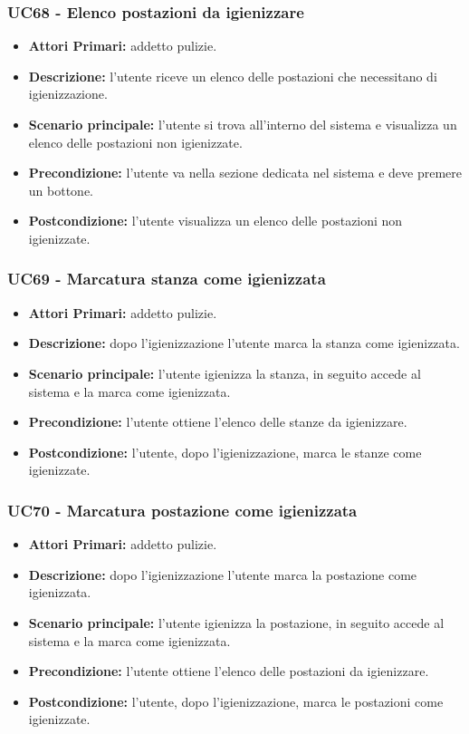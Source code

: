 \subsubsection{UC68 - Elenco postazioni da igienizzare}
\begin{itemize}
           	\item\textbf{Attori Primari:} addetto pulizie.
           	\item\textbf{Descrizione:} l'utente riceve un elenco delle postazioni che necessitano di igienizzazione.
           	\item\textbf{Scenario principale:} l'utente si trova all'interno del sistema e visualizza  un elenco delle postazioni non igienizzate.
           	\item\textbf{Precondizione:} l'utente va nella sezione dedicata nel sistema e deve premere un bottone.
           	\item\textbf{Postcondizione:} l'utente visualizza un elenco delle postazioni non igienizzate.
\end{itemize}

\subsubsection{UC69 - Marcatura stanza come igienizzata}
\begin{itemize}
           	\item\textbf{Attori Primari:} addetto pulizie.
           	\item\textbf{Descrizione:} dopo l'igienizzazione l'utente marca la stanza come igienizzata.
           	\item\textbf{Scenario principale:} l'utente igienizza la stanza, in seguito accede al sistema e la marca come igienizzata.
           	\item\textbf{Precondizione:} l'utente ottiene l'elenco delle stanze da igienizzare.
           	\item\textbf{Postcondizione:} l'utente, dopo l'igienizzazione, marca le stanze come igienizzate.
\end{itemize}

\subsubsection{UC70 - Marcatura postazione come igienizzata}
\begin{itemize}
           	\item\textbf{Attori Primari:} addetto pulizie.
           	\item\textbf{Descrizione:} dopo l'igienizzazione l'utente marca la postazione come igienizzata.
           	\item\textbf{Scenario principale:} l'utente igienizza la postazione, in seguito accede al sistema e la marca come igienizzata.
           	\item\textbf{Precondizione:} l'utente ottiene l'elenco delle postazioni da igienizzare.
           	\item\textbf{Postcondizione:} l'utente, dopo l'igienizzazione, marca le postazioni come igienizzate.
\end{itemize}

